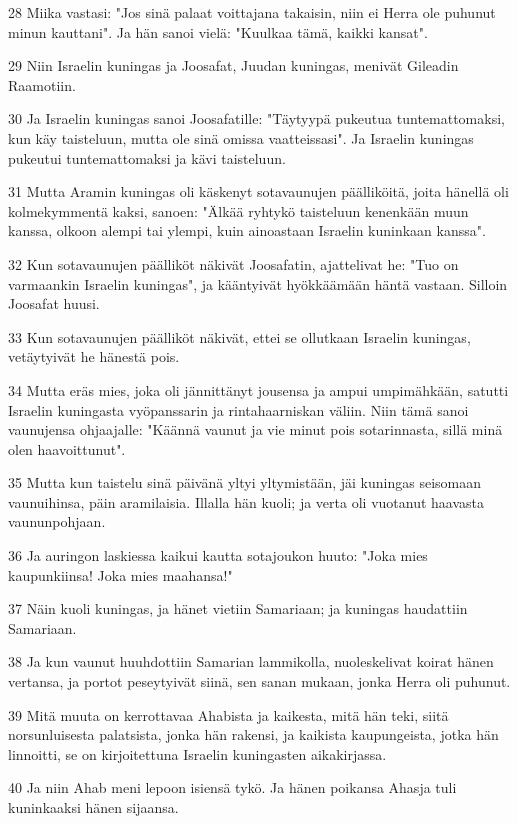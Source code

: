 \par 28 Miika vastasi: "Jos sinä palaat voittajana takaisin, niin ei Herra ole puhunut minun kauttani". Ja hän sanoi vielä: "Kuulkaa tämä, kaikki kansat".
\par 29 Niin Israelin kuningas ja Joosafat, Juudan kuningas, menivät Gileadin Raamotiin.
\par 30 Ja Israelin kuningas sanoi Joosafatille: "Täytyypä pukeutua tuntemattomaksi, kun käy taisteluun, mutta ole sinä omissa vaatteissasi". Ja Israelin kuningas pukeutui tuntemattomaksi ja kävi taisteluun.
\par 31 Mutta Aramin kuningas oli käskenyt sotavaunujen päälliköitä, joita hänellä oli kolmekymmentä kaksi, sanoen: "Älkää ryhtykö taisteluun kenenkään muun kanssa, olkoon alempi tai ylempi, kuin ainoastaan Israelin kuninkaan kanssa".
\par 32 Kun sotavaunujen päälliköt näkivät Joosafatin, ajattelivat he: "Tuo on varmaankin Israelin kuningas", ja kääntyivät hyökkäämään häntä vastaan. Silloin Joosafat huusi.
\par 33 Kun sotavaunujen päälliköt näkivät, ettei se ollutkaan Israelin kuningas, vetäytyivät he hänestä pois.
\par 34 Mutta eräs mies, joka oli jännittänyt jousensa ja ampui umpimähkään, satutti Israelin kuningasta vyöpanssarin ja rintahaarniskan väliin. Niin tämä sanoi vaunujensa ohjaajalle: "Käännä vaunut ja vie minut pois sotarinnasta, sillä minä olen haavoittunut".
\par 35 Mutta kun taistelu sinä päivänä yltyi yltymistään, jäi kuningas seisomaan vaunuihinsa, päin aramilaisia. Illalla hän kuoli; ja verta oli vuotanut haavasta vaununpohjaan.
\par 36 Ja auringon laskiessa kaikui kautta sotajoukon huuto: "Joka mies kaupunkiinsa! Joka mies maahansa!"
\par 37 Näin kuoli kuningas, ja hänet vietiin Samariaan; ja kuningas haudattiin Samariaan.
\par 38 Ja kun vaunut huuhdottiin Samarian lammikolla, nuoleskelivat koirat hänen vertansa, ja portot peseytyivät siinä, sen sanan mukaan, jonka Herra oli puhunut.
\par 39 Mitä muuta on kerrottavaa Ahabista ja kaikesta, mitä hän teki, siitä norsunluisesta palatsista, jonka hän rakensi, ja kaikista kaupungeista, jotka hän linnoitti, se on kirjoitettuna Israelin kuningasten aikakirjassa.
\par 40 Ja niin Ahab meni lepoon isiensä tykö. Ja hänen poikansa Ahasja tuli kuninkaaksi hänen sijaansa.
